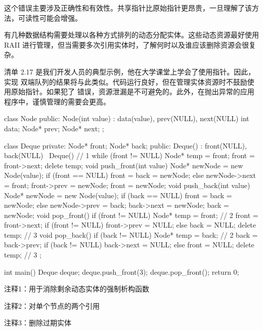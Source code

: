 这个错误主要涉及正确性和有效性。共享指针比原始指针更昂贵，一旦理解了该方法，可读性可能会增强。


有几种数据结构需要处理以各种方式排列的动态分配实体。这些动态资源最好使用 RAII 进行管理，但当需要多次引用实体时，了解何时以及谁应该删除资源会很复杂。

清单 2.17 是我们开发人员的典型示例，他在大学课堂上学会了使用指针。因此，实现 双端队列的结果将与此类似。代码运行良好，但在管理实体资源时不鼓励使用原始指针。如果犯了 错误，资源泄漏是不可避免的。此外，在抛出异常的应用程序中，谨慎管理的需要会更高。


\begin{cpp}
class Node {
public:
  Node(int value) : data(value), prev(NULL), next(NULL) {}
  int data;
  Node* prev;
  Node* next;
};

class Deque {
private:
  Node* front;
  Node* back;
public:
  Deque() : front(NULL), back(NULL) {}
  ~Deque() { // 1
    while (front != NULL) {
      Node* temp = front;
      front = front->next;
      delete temp;
    }
  }
  void push_front(int value) {
    Node* newNode = new Node(value);
    if (front == NULL)
      front = back = newNode;
    else {
      newNode->next = front;
      front->prev = newNode;
      front = newNode;
    }
  }
  void push_back(int value) {
    Node* newNode = new Node(value);
    if (back == NULL)
      front = back = newNode;
    else {
      newNode->prev = back;
      back->next = newNode;
      back = newNode;
    }
  }
  void pop_front() {
    if (front != NULL) {
      Node* temp = front; // 2
      front = front->next;
      if (front != NULL)
        front->prev = NULL;
      else
        back = NULL;
      delete temp; // 3
    }
  }
  void pop_back() {
    if (back != NULL) {
      Node* temp = back; // 2
      back = back->prev;
      if (back != NULL)
        back->next = NULL;
      else
        front = NULL;
      delete temp; // 3
    }
  }
};

int main() {
  Deque deque;
  deque.push_front(3);
  deque.pop_front();
  return 0;
}
\end{cpp}

{\footnotesize
注释1：用于消除剩余动态实体的强制析构函数

注释2：对单个节点的两个引用

注释3：删除过期实体
}


